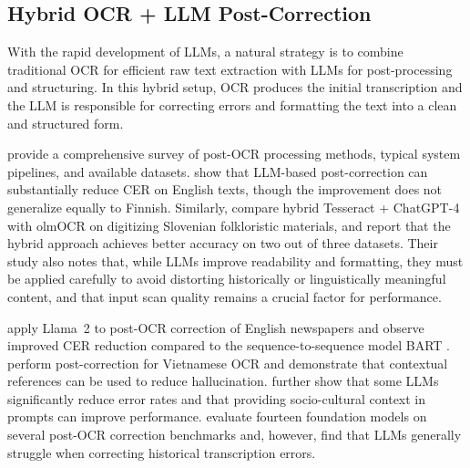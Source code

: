 
\subsection{Hybrid OCR + LLM Post-Correction}
With the rapid development of LLMs, a natural strategy is to combine traditional OCR for efficient raw text extraction with LLMs for post-processing and structuring. In this hybrid setup, OCR produces the initial transcription and the LLM is responsible for correcting errors and formatting the text into a clean and structured form.

\textcite{10.1145/3453476} provide a comprehensive survey of post-OCR processing methods, typical system pipelines, and available datasets. \textcite{DBLP:journals/corr/abs-2502-01205} show that LLM-based post-correction can substantially reduce CER on English texts, though the improvement does not generalize equally to Finnish. Similarly, \textcite{DBLP:journals/corr/abs-2507-19092} compare hybrid Tesseract + ChatGPT-4 with olmOCR on digitizing Slovenian folkloristic materials, and report that the hybrid approach achieves better accuracy on two out of three datasets. Their study also notes that, while LLMs improve readability and formatting, they must be applied carefully to avoid distorting historically or linguistically meaningful content, and that input scan quality remains a crucial factor for performance.

\textcite{thomas-etal-2024-leveraging} apply Llama~2 to post-OCR correction of English newspapers and observe improved CER reduction compared to the sequence-to-sequence model BART \parencite{lewis-etal-2020-bart}. \textcite{DBLP:conf/aaai/DoTVK25} perform post-correction for Vietnamese OCR and demonstrate that contextual references can be used to reduce hallucination. \textcite{DBLP:journals/corr/abs-2408-17428} further show that some LLMs significantly reduce error rates and that providing socio-cultural context in prompts can improve performance. \textcite{boros-etal-2024-post} evaluate fourteen foundation models on several post-OCR correction benchmarks and, however, find that LLMs generally struggle when correcting historical transcription errors.

